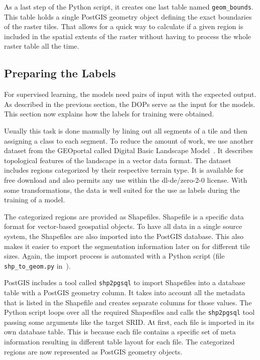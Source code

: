 As a last step of the Python script, it creates one last table named \texttt{geom\_bounds}. This table holds a single PostGIS geometry object defining the exact boundaries of the raster tiles. That allows for a quick way to calculate if a given region is included in the spatial extents of the raster without having to process the whole raster table all the time.

\subsection{Preparing the Labels}
\label{sec:prepare_labels}
For supervised learning, the models need pairs of input with the expected output. As described in the previous section, the DOPs serve as the input for the models. This section now explains how the labels for training were obtained.

Usually this task is done manually by lining out all segments of a tile and then assigning a class to each segment. To reduce the amount of work, we use another dataset from the GEOportal called Digital Basic Landscape Model~\cite{base-dlm20}. It describes topological features of the landscape in a vector data format. The dataset includes regions categorized by their respective terrain type. It is available for free download and also permits any use within the dl-de/zero-2-0 license. With some transformations, the data is well suited for the use as labels during the training of a model.

The categorized regions are provided as Shapefiles. Shapefile is a specific data format for vector-based geospatial objects. To have all data in a single source system, the Shapefiles are also imported into the PostGIS database. This also makes it easier to export the segmentation information later on for different tile sizes. Again, the import process is automated with a Python script (file \texttt{shp\_to\_geom.py} in~\cite{thesis-code20}).

PostGIS includes a tool called \texttt{shp2pgsql} to import Shapefiles into a database table with a PostGIS geometry column. It takes into account all the metadata that is listed in the Shapefile and creates separate columns for those values. The Python script loops over all the required Shapesfiles and calls the \texttt{shp2pgsql} tool passing some arguments like the target SRID. At first, each file is imported in its own database table. This is because each file contains a specific set of meta information resulting in different table layout for each file. The categorized regions are now represented as PostGIS geometry objects.

